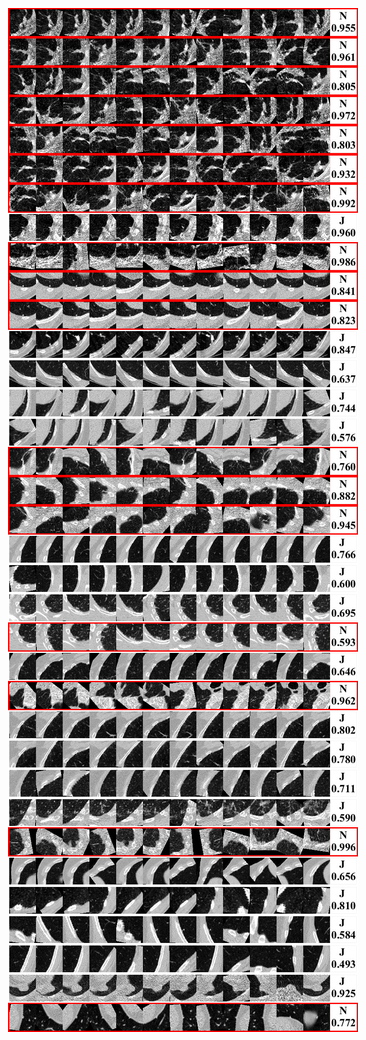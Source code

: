 \documentclass[onecolumn]{IEEEtran}
\begin{document}
\begin{figure}[H]
{\includegraphics[width=0.45\columnwidth]{./images/elcap-nodules-wall1}
}
\end{figure}
\newpage
\end{document}
